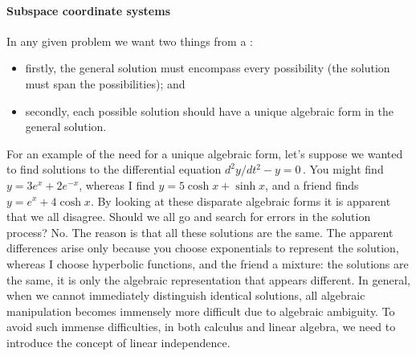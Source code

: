 \paragraph{Subspace coordinate systems} In any given problem we want two things from a : 
\begin{itemize}
\item firstly, the general solution must encompass every possibility (the solution must span the possibilities); and 
\item secondly, each possible solution should have a unique algebraic form in the general solution.
\end{itemize}
For an example of the need for a unique algebraic form, let's suppose we wanted to find solutions to the differential equation \(d^2y/dt^2-y=0\)\,. 
You might find \(y=3e^x+2e^{-x}\), whereas I find \(y=5\cosh x+\sinh x\), and a friend finds \(y=e^x+4\cosh x\).
By looking at these disparate algebraic forms it is apparent that we all disagree.
Should we all go and search for errors in the solution process?  No.
The reason is that all these solutions are the same.
The apparent differences arise only because you choose exponentials to represent the solution, whereas I choose hyperbolic functions, and the friend a mixture: the solutions are the same, it is only the algebraic representation that appears different. 
In general, when we cannot immediately distinguish identical solutions, all algebraic manipulation becomes immensely more difficult due to algebraic ambiguity.
To avoid such immense difficulties, in both calculus and linear algebra, we need to introduce the concept of linear independence.

